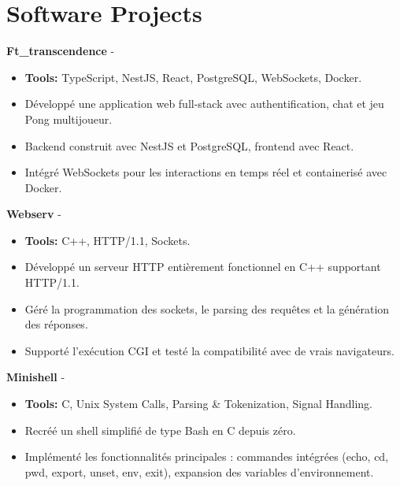 \documentclass[a4paper,11pt]{article}%
\begin{document}
\section*{Software Projects}%
%
\noindent \textbf{Ft\_transcendence} - \href{https://github.com/sboof911/ft_transcendence}{{}}%
\begin{itemize}[leftmargin=2em,parsep=0pt,topsep=1em]%
\item[] \textbf{Tools:} TypeScript, NestJS, React, PostgreSQL, WebSockets, Docker.%
\item D\'evelopp\'e une application web full-stack avec authentification, chat et jeu Pong multijoueur.%
\item Backend construit avec NestJS et PostgreSQL, frontend avec React.%
\item Int\'egr\'e WebSockets pour les interactions en temps r\'eel et containeris\'e avec Docker.%
\end{itemize}%
%
\noindent \textbf{Webserv} - \href{https://github.com/sboof911/webserv}{{}}%
\begin{itemize}[leftmargin=2em,parsep=0pt,topsep=1em]%
\item[] \textbf{Tools:} C++, HTTP/1.1, Sockets.%
\item D\'evelopp\'e un serveur HTTP enti\`erement fonctionnel en C++ supportant HTTP/1.1.%
\item G\'er\'e la programmation des sockets, le parsing des requ\^etes et la g\'en\'eration des r\'eponses.%
\item Support\'e l'ex\'ecution CGI et test\'e la compatibilit\'e avec de vrais navigateurs.%
\end{itemize}%
%
\noindent \textbf{Minishell} - \href{https://github.com/sboof911/minishell}{{}}%
\begin{itemize}[leftmargin=2em,parsep=0pt,topsep=1em]%
\item[] \textbf{Tools:} C, Unix System Calls, Parsing \& Tokenization, Signal Handling.%
\item Recr\'e\'e un shell simplifi\'e de type Bash en C depuis z\'ero.%
\item Impl\'ement\'e les fonctionnalit\'es principales : commandes int\'egr\'ees (echo, cd, pwd, export, unset, env, exit), expansion des variables d'environnement.%
\end{itemize}%
\end{document}
